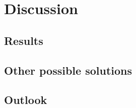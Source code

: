 \chapter{Discussion}

\section{Results}

\lipsum[1]


\section{Other possible solutions}

\lipsum[2]

\section{Outlook}


